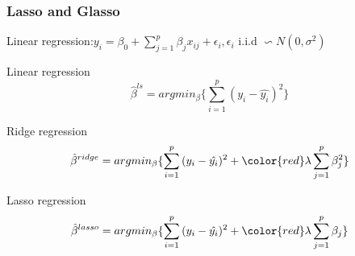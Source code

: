 \documentclass{beamer}
\begin{document}
\begin{frame}
\frametitle{Lasso and Glasso }
Linear regression:$y_i = \beta_0+\sum_{j=1}^p{\beta_jx_{ij}}+\epsilon_i,  \epsilon_i$ i.i.d $\backsim N(0,\sigma^2) $
\begin{block}{Linear regression}
\begin{equation}
\hat{\beta}^{ls}=argmin_{\beta}\{\sum_{i=1}^p{(y_i-\hat{y_i})^2}\}
\end{equation}
\end{block}
\begin{block}{Ridge regression}
\begin{equation}
\hat{\beta}^{ridge}=argmin_{\beta}\{\sum_{i=1}^p{(y_i-\hat{y_i})^2}+{\color{red}\lambda \sum_{j=1}^p\beta_j^2}\}
\end{equation}
\end{block}

\begin{block}{Lasso regression}
\begin{equation}
\hat{\beta}^{lasso}=argmin_{\beta}\{\sum_{i=1}^p{(y_i-\hat{y_i})^2}+{\color{red}\lambda\sum_{j=1}^p \beta_j}\}
\end{equation}
\end{block}

\end{frame}
\end{document}
